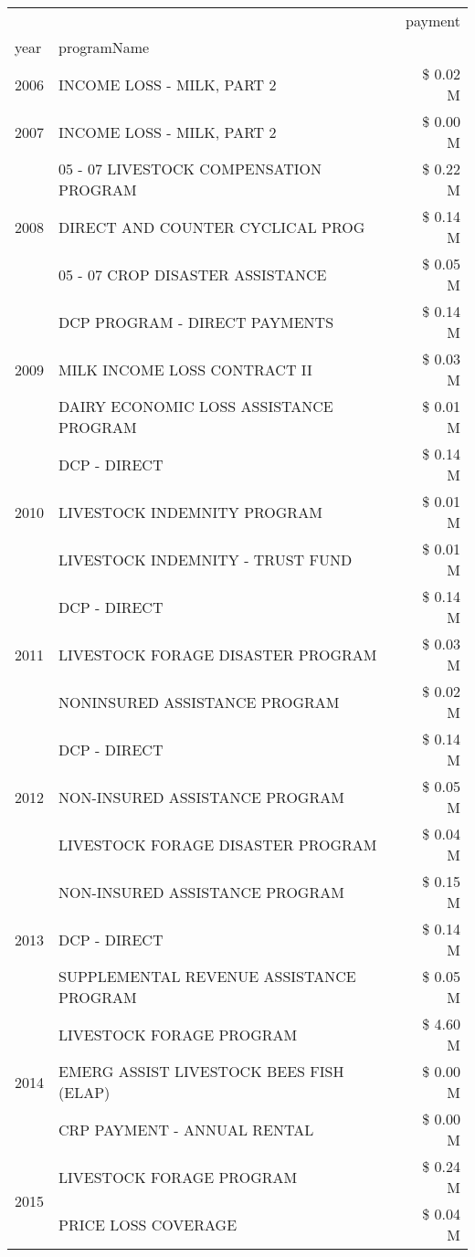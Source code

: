 \begin{tabular}{llr}
\toprule
 &  & payment \\
year & programName &  \\
\midrule
2006 & INCOME LOSS - MILK, PART 2 & \$ 0.02 M \\
\cline{1-3}
2007 & INCOME LOSS - MILK, PART 2 & \$ 0.00 M \\
\cline{1-3}
\multirow[t]{3}{*}{2008} & 05 - 07 LIVESTOCK COMPENSATION PROGRAM & \$ 0.22 M \\
 & DIRECT AND COUNTER CYCLICAL PROG & \$ 0.14 M \\
 & 05 - 07 CROP DISASTER ASSISTANCE & \$ 0.05 M \\
\cline{1-3}
\multirow[t]{3}{*}{2009} & DCP PROGRAM - DIRECT PAYMENTS & \$ 0.14 M \\
 & MILK INCOME LOSS CONTRACT II & \$ 0.03 M \\
 & DAIRY ECONOMIC LOSS ASSISTANCE PROGRAM & \$ 0.01 M \\
\cline{1-3}
\multirow[t]{3}{*}{2010} & DCP - DIRECT & \$ 0.14 M \\
 & LIVESTOCK INDEMNITY PROGRAM & \$ 0.01 M \\
 & LIVESTOCK INDEMNITY - TRUST FUND & \$ 0.01 M \\
\cline{1-3}
\multirow[t]{3}{*}{2011} & DCP - DIRECT & \$ 0.14 M \\
 & LIVESTOCK FORAGE DISASTER PROGRAM & \$ 0.03 M \\
 & NONINSURED ASSISTANCE PROGRAM & \$ 0.02 M \\
\cline{1-3}
\multirow[t]{3}{*}{2012} & DCP - DIRECT & \$ 0.14 M \\
 & NON-INSURED ASSISTANCE PROGRAM & \$ 0.05 M \\
 & LIVESTOCK FORAGE DISASTER PROGRAM & \$ 0.04 M \\
\cline{1-3}
\multirow[t]{3}{*}{2013} & NON-INSURED ASSISTANCE PROGRAM & \$ 0.15 M \\
 & DCP - DIRECT & \$ 0.14 M \\
 & SUPPLEMENTAL REVENUE ASSISTANCE PROGRAM & \$ 0.05 M \\
\cline{1-3}
\multirow[t]{3}{*}{2014} & LIVESTOCK FORAGE PROGRAM & \$ 4.60 M \\
 & EMERG ASSIST LIVESTOCK BEES FISH (ELAP) & \$ 0.00 M \\
 & CRP PAYMENT - ANNUAL RENTAL & \$ 0.00 M \\
\cline{1-3}
\multirow[t]{3}{*}{2015} & LIVESTOCK FORAGE PROGRAM & \$ 0.24 M \\
 & PRICE LOSS COVERAGE & \$ 0.04 M \\

\end{tabular}
